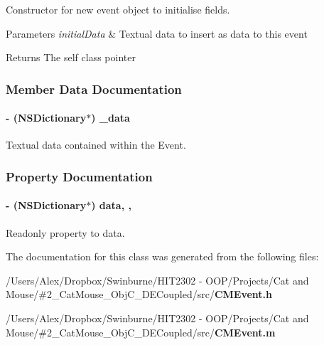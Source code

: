 Constructor for new event object to initialise fields. 


\begin{DoxyParams}{Parameters}
{\em initial\-Data} & Textual data to insert as data to this event \\
\hline
\end{DoxyParams}
\begin{DoxyReturn}{Returns}
The self class pointer 
\end{DoxyReturn}


\subsubsection{Member Data Documentation}
\paragraph[{\-\_\-data}]{\setlength{\rightskip}{0pt plus 5cm}-\/ (N\-S\-Dictionary$\ast$) \-\_\-data\hspace{0.3cm}{\ttfamily [protected]}}\label{interface_c_m_event_a944e237efc5d97b04e1b89c23587b7ed}


Textual data contained within the Event. 



\subsubsection{Property Documentation}
\paragraph[{data}]{\setlength{\rightskip}{0pt plus 5cm}-\/ (N\-S\-Dictionary$\ast$) data\hspace{0.3cm}{\ttfamily [read]}, {\ttfamily [atomic]}, {\ttfamily [assign]}}\label{interface_c_m_event_a1956e3e8fe27d1558722e143f1ea723e}


Readonly property to data. 



The documentation for this class was generated from the following files\-:\begin{DoxyCompactItemize}
\item 
/\-Users/\-Alex/\-Dropbox/\-Swinburne/\-H\-I\-T2302 -\/ O\-O\-P/\-Projects/\-Cat and Mouse/\#2\-\_\-\-Cat\-Mouse\-\_\-\-Obj\-C\-\_\-\-D\-E\-Coupled/src/{\bf C\-M\-Event.\-h}\item 
/\-Users/\-Alex/\-Dropbox/\-Swinburne/\-H\-I\-T2302 -\/ O\-O\-P/\-Projects/\-Cat and Mouse/\#2\-\_\-\-Cat\-Mouse\-\_\-\-Obj\-C\-\_\-\-D\-E\-Coupled/src/{\bf C\-M\-Event.\-m}\end{DoxyCompactItemize}
